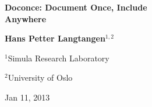 \documentclass[%
oneside,                 %
final,                   %
10pt]{article}
\begin{document}






\begin{center}
{\LARGE\bf Doconce: Document Once, Include \\ [1.5mm] Anywhere}
\end{center}





\begin{center}
{\bf Hans Petter Langtangen${}^{1, 2}$} \\ [0mm]
\end{center}

\begin{center}
\centerline{{\small ${}^1$Simula Research Laboratory}}
\centerline{{\small ${}^2$University of Oslo}}
\end{center}





\begin{center}
Jan 11, 2013
\end{center}

\vspace{1cm}
\end{document}

